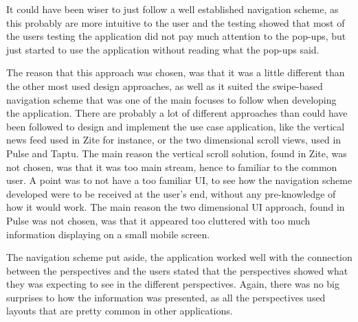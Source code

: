 It could have been wiser to just follow a well established navigation scheme, as this probably are more intuitive to the user and the testing showed that most of the users testing the application did not pay much attention to the pop-ups, but just started to use the application without reading what the pop-ups said.

The reason that this approach was chosen, was that it was a little different than the other most used design approaches, as well as it suited the swipe-based navigation scheme that was one of the main focuses to follow when developing the application. There are probably a lot of different approaches than could have been followed to design and implement the use case application, like the vertical news feed used in Zite for instance, or the two dimensional scroll views, used in Pulse and Taptu. The main reason the vertical scroll solution, found in Zite, was not chosen, was that it was too main stream, hence to familiar to the common user. A point was to not have a too familiar UI, to see how the navigation scheme developed were to be received at the user's end, without any pre-knowledge of how it would work. The main reason the two dimensional UI approach, found in Pulse was not chosen, was that it appeared too cluttered with too much information displaying on a small mobile screen.

The navigation scheme put aside, the application worked well with the connection between the perspectives and the users stated that the perspectives showed what they was expecting to see in the different perspectives. Again, there was no big surprises to how the information was presented, as all the perspectives used layouts that are pretty common in other applications.











